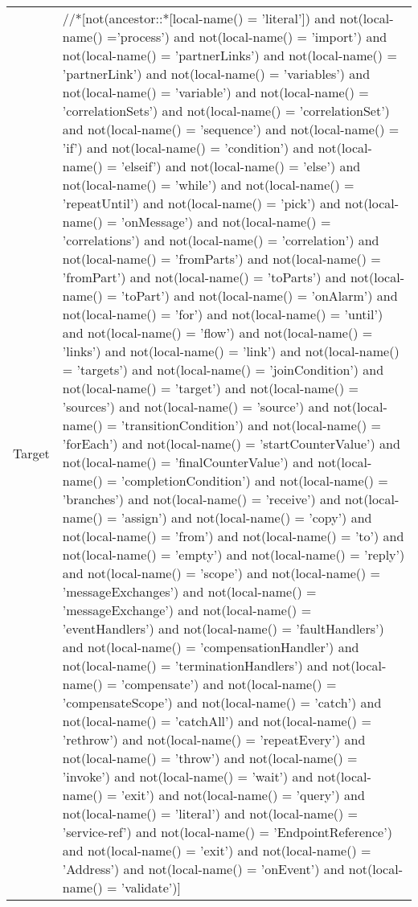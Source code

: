 \begin{center}
\begin{tiny}
\begin{longtable}{p{}|p{}}
Target & //*[not(ancestor::*[local-name() = 'literal']) and not(local-name() ='process') and not(local-name() = 'import') and not(local-name() = 'partnerLinks') and not(local-name() = 'partnerLink') and not(local-name() = 'variables') and not(local-name() = 'variable') and not(local-name() = 'correlationSets') and not(local-name() = 'correlationSet') and not(local-name() = 'sequence') and not(local-name() = 'if') and not(local-name() = 'condition') and not(local-name() = 'elseif') and not(local-name() = 'else') and not(local-name() = 'while') and not(local-name() = 'repeatUntil') and not(local-name() = 'pick') and not(local-name() = 'onMessage') and not(local-name() = 'correlations') and not(local-name() = 'correlation') and not(local-name() = 'fromParts') and not(local-name() = 'fromPart') and not(local-name() = 'toParts') and not(local-name() = 'toPart') and not(local-name() = 'onAlarm') and not(local-name() = 'for') and not(local-name() = 'until') and not(local-name() = 'flow') and not(local-name() = 'links') and not(local-name() = 'link') and not(local-name() = 'targets') and not(local-name() = 'joinCondition') and not(local-name() = 'target') and not(local-name() = 'sources') and not(local-name() = 'source') and not(local-name() = 'transitionCondition') and not(local-name() = 'forEach') and not(local-name() = 'startCounterValue') and not(local-name() = 'finalCounterValue') and not(local-name() = 'completionCondition') and not(local-name() = 'branches') and not(local-name() = 'receive') and not(local-name() = 'assign') and not(local-name() = 'copy') and not(local-name() = 'from') and not(local-name() = 'to') and not(local-name() = 'empty') and not(local-name() = 'reply') and not(local-name() = 'scope') and not(local-name() = 'messageExchanges') and not(local-name() = 'messageExchange') and not(local-name() = 'eventHandlers') and not(local-name() = 'faultHandlers') and not(local-name() = 'compensationHandler') and not(local-name() = 'terminationHandlers') and not(local-name() = 'compensate') and not(local-name() = 'compensateScope') and not(local-name() = 'catch') and not(local-name() = 'catchAll')  and not(local-name() = 'rethrow') and not(local-name() = 'repeatEvery') and not(local-name() = 'throw') and not(local-name() = 'invoke') and not(local-name() = 'wait') and not(local-name() = 'exit') and not(local-name() = 'query') and not(local-name() = 'literal') and not(local-name() = 'service-ref') and not(local-name() = 'EndpointReference') and not(local-name() = 'exit') and not(local-name() = 'Address') and not(local-name() = 'onEvent') and not(local-name() = 'validate')]\\

\end{longtable}
\end{tiny}
\end{center}
